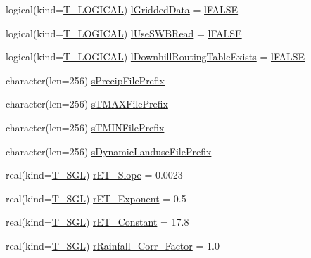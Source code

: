\begin{DoxyCompactItemize}
\item 
logical(kind=\hyperlink{namespacetypes_adfa8f4f6096bb7bdbb93f36b911dcaad}{T\_\-LOGICAL}) \hyperlink{typetypes_1_1_t___m_o_d_e_l___c_o_n_f_i_g_u_r_a_t_i_o_n_ab6b943a08794ac6c33b2c5cd391abefd}{lGriddedData} = \hyperlink{namespacetypes_ad09a27b431e0fad201524039e6943e5b}{lFALSE}
\item 
logical(kind=\hyperlink{namespacetypes_adfa8f4f6096bb7bdbb93f36b911dcaad}{T\_\-LOGICAL}) \hyperlink{typetypes_1_1_t___m_o_d_e_l___c_o_n_f_i_g_u_r_a_t_i_o_n_a0e590e3b9e915036057f5d6e22cb1b22}{lUseSWBRead} = \hyperlink{namespacetypes_ad09a27b431e0fad201524039e6943e5b}{lFALSE}
\item 
logical(kind=\hyperlink{namespacetypes_adfa8f4f6096bb7bdbb93f36b911dcaad}{T\_\-LOGICAL}) \hyperlink{typetypes_1_1_t___m_o_d_e_l___c_o_n_f_i_g_u_r_a_t_i_o_n_a46e0f6a899f46179cc5649de5ed951f0}{lDownhillRoutingTableExists} = \hyperlink{namespacetypes_ad09a27b431e0fad201524039e6943e5b}{lFALSE}
\item 
character(len=256) \hyperlink{typetypes_1_1_t___m_o_d_e_l___c_o_n_f_i_g_u_r_a_t_i_o_n_ad10bbe871fbefd73373e6533207cbf35}{sPrecipFilePrefix}
\item 
character(len=256) \hyperlink{typetypes_1_1_t___m_o_d_e_l___c_o_n_f_i_g_u_r_a_t_i_o_n_a2450e192f40628020ef436689696d447}{sTMAXFilePrefix}
\item 
character(len=256) \hyperlink{typetypes_1_1_t___m_o_d_e_l___c_o_n_f_i_g_u_r_a_t_i_o_n_a6597dd634578c62684ecc4fe1a06538c}{sTMINFilePrefix}
\item 
character(len=256) \hyperlink{typetypes_1_1_t___m_o_d_e_l___c_o_n_f_i_g_u_r_a_t_i_o_n_a473e76f0d3217bb761827ab5e19b39ce}{sDynamicLanduseFilePrefix}
\item 
real(kind=\hyperlink{namespacetypes_af3012489af4c138f271f1bce244b7e51}{T\_\-SGL}) \hyperlink{typetypes_1_1_t___m_o_d_e_l___c_o_n_f_i_g_u_r_a_t_i_o_n_a95a4591a40aa58b67380dcbe6d7ee8c5}{rET\_\-Slope} = 0.0023
\item 
real(kind=\hyperlink{namespacetypes_af3012489af4c138f271f1bce244b7e51}{T\_\-SGL}) \hyperlink{typetypes_1_1_t___m_o_d_e_l___c_o_n_f_i_g_u_r_a_t_i_o_n_ab81a4b730853a8dfc0262bf4cebac5f0}{rET\_\-Exponent} = 0.5
\item 
real(kind=\hyperlink{namespacetypes_af3012489af4c138f271f1bce244b7e51}{T\_\-SGL}) \hyperlink{typetypes_1_1_t___m_o_d_e_l___c_o_n_f_i_g_u_r_a_t_i_o_n_aee473a29bafdebd987715c5f77da0d69}{rET\_\-Constant} = 17.8
\item 
real(kind=\hyperlink{namespacetypes_af3012489af4c138f271f1bce244b7e51}{T\_\-SGL}) \hyperlink{typetypes_1_1_t___m_o_d_e_l___c_o_n_f_i_g_u_r_a_t_i_o_n_a5240408f50d8ffd3c3c91a59c6809fa0}{rRainfall\_\-Corr\_\-Factor} = 1.0

\end{DoxyCompactItemize}
